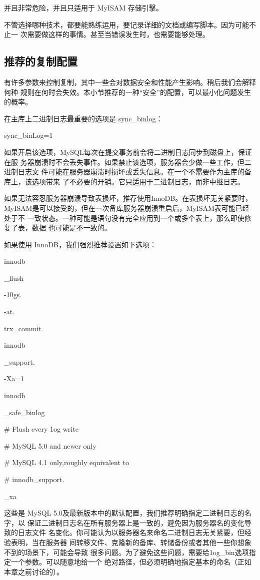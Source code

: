 并且非常危险，并且只适用于 MyISAM 存储引擊。

不管选择哪种技术，都要能熟练运用，要记录详细的文档或编写脚本。因为可能不止一
次需要做这样的事情。甚至当错误发生时，也需要能够处理。

\subsection{推荐的复制配置}
有许多参数来控制复制，其中一些会对数据安全和性能产生影响。稍后我们会解释何种
规则在何时会失效。本小节推荐的一种“安全”的配置，可以最小化问题发生的概率。

在主库上二进制日志最重要的选项是 sync\_binlog：

sync\_binLog=1

如果开启该选项，MySQL每次在提交事务前会将二进制日志同步到磁盘上，保证在服
务器崩溃时不会丢失事件。如果禁止该选项，服务器会少做一些工作，但二进制日志文
件可能在服务器崩溃时损坏或丢失信息。在一个不需要作为主库的备库上，该选项带来
了不必要的开销。它只适用于二进制日志，而非中继日志。

如果无法容忍服务器崩溃导致表损坏，推荐使用InnoDB。在表损坏无关紧要时，
MyISAM是可以接受的，但在一次备库服务器崩溃重启后，MyISAM表可能已经处于不
一致状态。一种可能是语句没有完全应用到一个或多个表上，那么即使修复了表，数据
也可能是不一致的。

如果使用 InnoDB，我们强烈推荐设置如下选项：

innodb

\_flush

-10gs.

-at.

trx\_commit

innodb

\_support.

-Xa=1

innodb

\_safe\_binlog

# Flush every 1og write

# MySQL 5.0 and newer only

# MySQL 4.1 only,roughly equivalent to

# innodb\_support.

\_xa

这些是 MySQL 5.0及最新版本中的默认配置，我们推荐明确指定二进制日志的名字，以
保证二进制日志名在所有服务器上是一致的，避免因为服务器名的变化导致的日志文件
名变化。你可能认为以服务器名来命名二进制日志无关紧要，但经验表明，当在服务器
间转移文件、克隆新的备库、转储备份或者其他一些你想象不到的场景下，可能会导致
很多问题。为了避免这些问题，需要给1og\_bin选项指定一个参数。可以随意地给一个
绝对路径，但必须明确地指定基本的命名（正如本章之前讨论的）。

